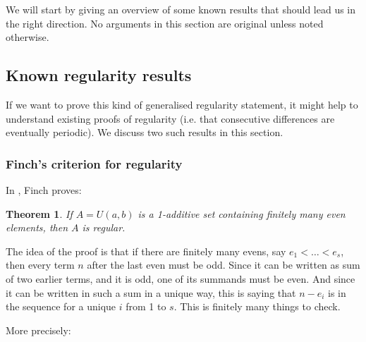 \documentclass{article}
\newtheorem{theorem}{Theorem}[section]
\theoremstyle{definition}
\theoremstyle{remark}
\numberwithin{equation}{section}
\begin{document}
We will start by giving an overview of some known results that should
lead us in the right direction.  No arguments in this section are
original unless noted otherwise.

\subsection{Known regularity results}

If we want to prove this kind of generalised regularity statement, it
might help to understand existing proofs of regularity (i.e. that
consecutive differences are eventually periodic).  We discuss two such
results in this section.

\subsubsection{Finch's criterion for regularity}

In \cite{regularity_criterion_finch}, Finch proves:

\begin{theorem}
If $A = U(a,b)$ is a 1-additive set containing finitely many even
elements, then $A$ is regular.  
\end{theorem}

The idea of the proof is that if there are finitely many evens, say
$e_1 < \ldots < e_s$, then every term $n$ after the last even must be
odd.  Since it can be written as sum of two earlier terms, and it is
odd, one of its summands must be even.  And since it can be written in
such a sum in a unique way, this is saying that $n - e_i$ is in the
sequence for a unique $i$ from 1 to $s$.  This is finitely many things
to check.

More precisely:
\end{document}
